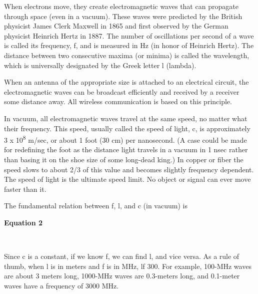 \documentclass[b5paper,11pt]{memoir}
\begin{document}
When electrons move, they create electromagnetic waves that can
propagate through space (even in a vacuum). These waves were predicted
by the British physicist James Clerk Maxwell in 1865 and first observed
by the German physicist Heinrich Hertz in 1887. The number of
oscillations per second of a wave is called its {frequency}, {f}, and is
measured in {Hz} (in honor of Heinrich Hertz). The distance between two
consecutive maxima (or minima) is called the {wavelength}, which is
universally designated by the Greek letter {l} (lambda).

When an antenna of the appropriate size is attached to an electrical
circuit, the electromagnetic waves can be broadcast efficiently and
received by a receiver some distance away. All wireless communication is
based on this principle.

In vacuum, all electromagnetic waves travel at the same speed, no matter
what their frequency. This speed, usually called the {speed of light},
{c}, is approximately 3 x 10\textsuperscript{8} m/sec, or about 1 foot
(30 cm) per nanosecond. (A case could be made for redefining the foot as
the distance light travels in a vacuum in 1 nsec rather than basing it
on the shoe size of some long-dead king.) In copper or fiber the speed
slows to about 2/3 of this value and becomes slightly frequency
dependent. The speed of light is the ultimate speed limit. No object or
signal can ever move faster than it.

The fundamental relation between {f}, {l}, and {c} (in vacuum) is

\textbf{\protect\hypertarget{0130661023_ch02lev1sec3.htmlux5cux23ch02eq02}{}{}
Equation 2}


~

Since {c} is a constant, if we know {f}, we can find {l}, and vice
versa. As a rule of thumb, when {l} is in meters and {f} is in MHz,
{l}{f}
 300. For example, 100-MHz waves are
about 3 meters long, 1000-MHz waves are 0.3-meters long, and 0.1-meter
waves have a frequency of 3000 MHz.
\end{document}
